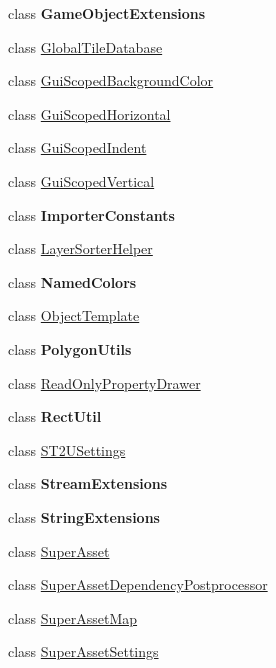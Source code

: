 \begin{DoxyCompactItemize}
\item 
class {\bfseries Game\+Object\+Extensions}
\item 
class \mbox{\hyperlink{class_super_tiled2_unity_1_1_editor_1_1_global_tile_database}{Global\+Tile\+Database}}
\item 
class \mbox{\hyperlink{class_super_tiled2_unity_1_1_editor_1_1_gui_scoped_background_color}{Gui\+Scoped\+Background\+Color}}
\item 
class \mbox{\hyperlink{class_super_tiled2_unity_1_1_editor_1_1_gui_scoped_horizontal}{Gui\+Scoped\+Horizontal}}
\item 
class \mbox{\hyperlink{class_super_tiled2_unity_1_1_editor_1_1_gui_scoped_indent}{Gui\+Scoped\+Indent}}
\item 
class \mbox{\hyperlink{class_super_tiled2_unity_1_1_editor_1_1_gui_scoped_vertical}{Gui\+Scoped\+Vertical}}
\item 
class {\bfseries Importer\+Constants}
\item 
class \mbox{\hyperlink{class_super_tiled2_unity_1_1_editor_1_1_layer_sorter_helper}{Layer\+Sorter\+Helper}}
\item 
class {\bfseries Named\+Colors}
\item 
class \mbox{\hyperlink{class_super_tiled2_unity_1_1_editor_1_1_object_template}{Object\+Template}}
\item 
class {\bfseries Polygon\+Utils}
\item 
class \mbox{\hyperlink{class_super_tiled2_unity_1_1_editor_1_1_read_only_property_drawer}{Read\+Only\+Property\+Drawer}}
\item 
class {\bfseries Rect\+Util}
\item 
class \mbox{\hyperlink{class_super_tiled2_unity_1_1_editor_1_1_s_t2_u_settings}{S\+T2\+U\+Settings}}
\item 
class {\bfseries Stream\+Extensions}
\item 
class {\bfseries String\+Extensions}
\item 
class \mbox{\hyperlink{class_super_tiled2_unity_1_1_editor_1_1_super_asset}{Super\+Asset}}
\item 
class \mbox{\hyperlink{class_super_tiled2_unity_1_1_editor_1_1_super_asset_dependency_postprocessor}{Super\+Asset\+Dependency\+Postprocessor}}
\item 
class \mbox{\hyperlink{class_super_tiled2_unity_1_1_editor_1_1_super_asset_map}{Super\+Asset\+Map}}
\item 
class \mbox{\hyperlink{class_super_tiled2_unity_1_1_editor_1_1_super_asset_settings}{Super\+Asset\+Settings}}

\end{DoxyCompactItemize}
